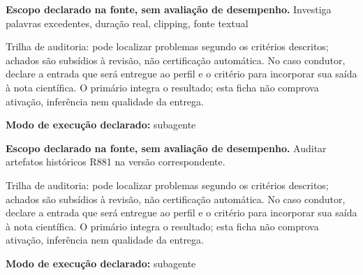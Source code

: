 
\begin{descricao}
\textbf{Escopo declarado na fonte, sem avaliação de desempenho.}
Investiga palavras excedentes, duração real, clipping, fonte textual
\end{descricao}

\begin{funcao}
Trilha de auditoria: pode localizar problemas segundo os critérios descritos; achados são subsídios à revisão, não certificação automática. No caso condutor, declare a entrada que será entregue ao perfil e o critério para incorporar sua saída à nota científica. O primário integra o resultado; esta ficha não comprova ativação, inferência nem qualidade da entrega.
\end{funcao}

\begin{arquitetura}
\textbf{Modo de execução declarado:} subagente
\end{arquitetura}


\begin{descricao}
\textbf{Escopo declarado na fonte, sem avaliação de desempenho.}
Auditar artefatos históricos R881 na versão correspondente.
\end{descricao}

\begin{funcao}
Trilha de auditoria: pode localizar problemas segundo os critérios descritos; achados são subsídios à revisão, não certificação automática. No caso condutor, declare a entrada que será entregue ao perfil e o critério para incorporar sua saída à nota científica. O primário integra o resultado; esta ficha não comprova ativação, inferência nem qualidade da entrega.
\end{funcao}

\begin{arquitetura}
\textbf{Modo de execução declarado:} subagente
\end{arquitetura}


